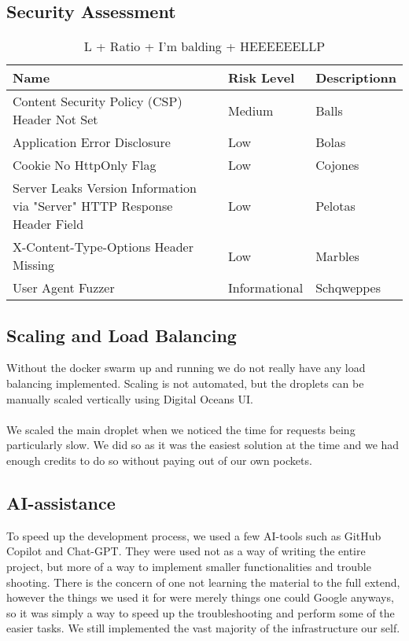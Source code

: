 \subsection*{Security Assessment}

\begin{table}[h]
\begin{tabular}{||>{\centering}m{7cm}| >{\centering}m{2.5cm} |>{\centering\arraybackslash}m{6cm}||}
    \hline
    Name & Risk Level & Descriptionn\\
    \hline\hline
    Content Security Policy (CSP) Header Not Set & Medium & Balls\\
    \hline
    Application Error Disclosure & Low & Bolas\\
    \hline
    Cookie No HttpOnly Flag & Low & Cojones\\
    \hline
    Server Leaks Version Information via "Server" HTTP Response Header Field & Low & Pelotas\\
    \hline
    X-Content-Type-Options Header Missing & Low & Marbles\\
    \hline
    User Agent Fuzzer & Informational & Schqweppes\\
    \hline
\end{tabular}
\caption{L + Ratio + I'm balding + HEEEEEELLP}
\label{table:summary_stats}
\end{table}

\subsection*{Scaling and Load Balancing}

Without the docker swarm up and running we do not really have any load balancing implemented. Scaling is not automated, but the droplets can be manually scaled vertically using Digital Oceans UI.
\\\\
We scaled the main droplet when we noticed the time for requests being particularly slow. We did so as it was the easiest solution at the time and we had enough credits to do so without paying out of our own pockets.

\subsection*{AI-assistance}

To speed up the development process, we used a few AI-tools such as GitHub Copilot and Chat-GPT. They were used not as a way of writing the entire project, but more of a way to implement smaller functionalities and trouble shooting. There is the concern of one not learning the material to the full extend, however the things we used it for were merely things one could Google anyways, so it was simply a way to speed up the troubleshooting and perform some of the easier tasks. We still implemented the vast majority of the infrastructure our self.